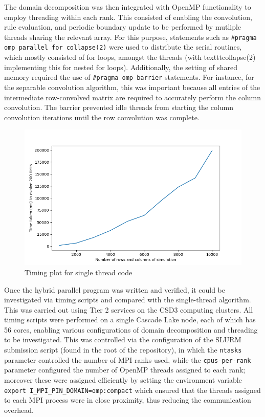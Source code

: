 \documentclass[12pt]{article}
\begin{document}
The domain decomposition was then integrated with OpenMP functionality to employ threading within each rank.
This consisted of enabling the convolution, rule evaluation, and periodic boundary update to be performed by mutliple threads sharing the relevant array.
For this purpose, statements such as \texttt{\#pragma omp parallel for collapse(2)} were used to distribute the serial routines,
which mostly consisted of for loops, amongst the threads (with texttt{collapse(2)} implementing this for nested for loops).
Additionally, the setting of shared memory required the use of \texttt{\#pragma omp barrier} statements.
For instance, for the separable convolution algorithm, this was important because all entries of the intermediate row-convolved matrix are required to accurately perform the column convolution.
The barrier prevented idle threads from starting the column convolution iterations until the row convolution was complete.

\begin{figure}[hp]
    \includegraphics[scale=0.65, center]{figures/time_simulation.png}
    \caption{Timing plot for single thread code}
    \label{fig:time_single}
\end{figure}

Once the hybrid parallel program was written and verified, it could be investigated via timing scripts and compared with the single-thread algorithm.
This was carried out using Tier 2 services on the CSD3 computing clusters.
All timing scripts were performed on a single Cascade Lake node, each of which has 56 cores,
enabling various configurations of domain decomposition and threading to be investigated.
This was controlled via the configuration of the SLURM submission script (found in the root of the repository),
in which the \texttt{ntasks} parameter controlled the number of MPI ranks used,
while the \texttt{cpus-per-rank} parameter configured the number of OpenMP threads assigned to each rank;
moreover these were assigned efficiently by setting the environment variable \texttt{export I\_MPI\_PIN\_DOMAIN=omp:compact} which ensured that the threads assigned to each MPI process were in close proximity,
thus reducing the communication overhead.
\end{document}
